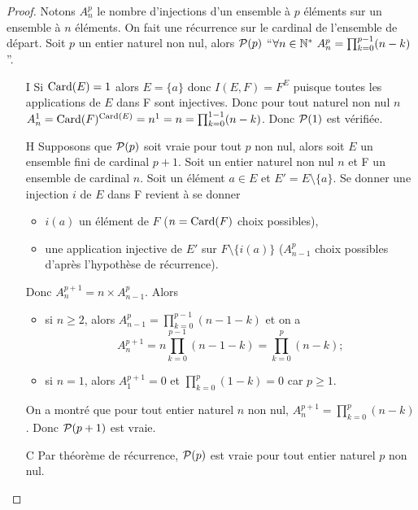 \begin{proof}
  Notons \(A_n^p\) le nombre d'injections d'un ensemble à \(p\) éléments sur un 
  ensemble à \(n\) éléments. On fait une récurrence sur le cardinal de 
  l'ensemble de départ. Soit \(p\) un entier naturel non nul, alors \(\P(p)\) 
  ``\(\forall n \in \N^* \ A_n^p = \prod_{k = 0}^{p - 1}(n - k)\)''.
  \begin{itemize}
    \item[I] Si \(\Card(E)=1\) alors \(E = \{a\}\) donc \(I(E, F)=F^E\) puisque 
      toutes les applications de \(E\) dans F sont injectives. Donc pour tout 
      naturel non nul \(n\) 
      \(A_n^1 = \Card(F)^{\Card(E)}=n^1 = n = \prod_{k = 0}^{1 - 1}(n - k)\). 
      Donc \(\P(1)\) est vérifiée.
    \item[H] Supposons que \(\P(p)\) soit vraie pour tout \(p\) non nul, alors 
      soit \(E\) un ensemble fini de cardinal \(p + 1\). Soit un entier naturel 
      non nul \(n\) et F un ensemble de cardinal \(n\). Soit un élément \(a\in 
      E\) et \(E'=E\setminus\{a\}\). Se donner une injection \(i\) de \(E\) dans 
      F revient à se donner
      \begin{itemize}
        \item \(i(a)\) un élément de \(F\) (\(n = \Card(F)\) choix possibles),
        \item une application injective de \(E'\) sur \(F\setminus\{i(a)\}\) 
          (\(A_{n - 1}^p\) choix possibles d'après l'hypothèse de récurrence).
      \end{itemize}
      Donc \(A_{n}^{p + 1}=n \times A_{n - 1}^p\). Alors \begin{itemize}
        \item si \(n\geqslant 2\), alors  \(A_{n - 1}^p = \prod_{k = 0}^{p - 
          1}(n - 1 - k)\) et on a
          \begin{equation}
            A_{n}^{p + 1}=n\prod_{k = 0}^{p - 1}(n - 1 - k)=\prod_{k = 0}^{p}(n 
            - k);
          \end{equation}
        \item si \(n = 1\), alors \(A_{1}^{p + 1}=0\) et \(\prod_{k = 0}^{p}(1 - 
          k) = 0\) car \(p\geqslant 1\).
      \end{itemize}
      On a montré que pour tout entier naturel \(n\) non nul, 
      \(A_{n}^{p + 1} = \prod_{k = 0}^{p}(n - k)\). Donc \(\P(p + 1)\) est vraie.
    \item[C] Par théorème de récurrence, \(\P(p)\) est vraie pour tout entier 
      naturel \(p\) non nul.
  \end{itemize}
\end{proof}

